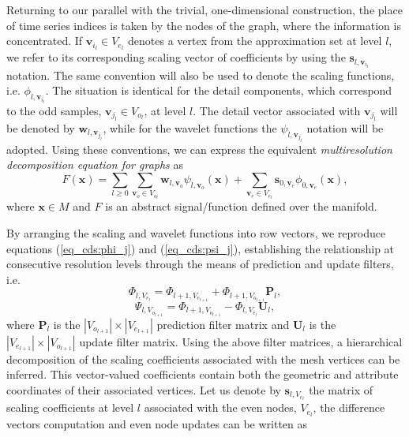 \documentclass[graybox]{svmult}
\begin{document}
Returning to our parallel with the trivial, one-dimensional construction, the place of time series indices is taken by the nodes of the graph, where the information is concentrated. If $\mathbf{v}_{i_l} \in  {V}_{e_l}$ denotes a vertex from the approximation set at level $l$, we refer to its corresponding scaling vector of coefficients by using the $\mathbf{s}_{l,\mathbf{v}_{i_l}}$ notation. The same convention will also be used to denote the scaling functions, i.e. $\phi_{l,\mathbf{v}_{i_l}}$. The situation is identical for the detail components, which correspond to the odd samples, $\mathbf{v}_{j_l} \in V_{o_l}$, at level $l$. The detail vector associated with $\mathbf{v}_{j_l}$ will be denoted by $\mathbf{w}_{l,\mathbf{v}_{j_l}}$, while for the wavelet functions the $\psi_{l,\mathbf{v}_{j_l}}$ notation will be adopted. Using these conventions, we can express the equivalent \emph{multiresolution decomposition equation for graphs} as
\begin{equation}
F(\mathbf{x}) = \sum_{l \geq 0 } \sum_{\mathbf{v}_o \in V_{o_l}} \mathbf{w}_{l,\mathbf{v}_o} \psi_{l, \mathbf{v}_o } (\mathbf{x}) + \sum_{\mathbf{v}_e \in V_{e_l} } \mathbf{s}_{0, \mathbf{v}_e} \phi_{0, \mathbf{v}_e}(\mathbf{x}),
\label{eq_cds:multiresolution_surface}
\end{equation}
where $\mathbf{x} \in M$ and $F$ is an abstract signal/function defined over the manifold.


By arranging the scaling and wavelet functions into row vectors, we reproduce equations (\ref{eq_cds:phi_j}) and (\ref{eq_cds:psi_j}), establishing the relationship at consecutive resolution levels through the means of prediction and update filters, i.e.
\begin{equation}
\Phi_{l,V_{e_l}} = \Phi_{l+1,V_{e_{l+1}}} +  \Phi_{l+1, V_{o_{l+1}}} \mathbf{P}_l,
\label{eq_cds:prediction_functions}
\end{equation}
\begin{equation}
\Psi_{l,V_{o_{l+1}}} = \Phi_{l+1,V_{o_{l+1}}} - \Phi_{l,V_{e_l}}  \mathbf{U}_l,
\label{eq_cds:update_functions}
\end{equation}
where $\mathbf{P}_l$ is the $|V_{o_{l+1}}| \times |V_{e_{l+1}}|$ prediction filter matrix and $\mathbf{U}_l$ is the  $|V_{e_{l+1}}| \times |V_{o_{l+1}}|$ update filter matrix.
Using the above filter matrices, a hierarchical decomposition of the scaling coefficients associated with the mesh vertices can be inferred. This vector-valued coefficients contain both the geometric and attribute coordinates of their associated vertices. Let us denote by $\mathbf{s}_{l,V_{e_l}}$ the matrix of scaling coefficients at level $l$ associated with the even nodes, $V_{e_l}$, the difference vectors computation and even node updates can be written as
\end{document}
